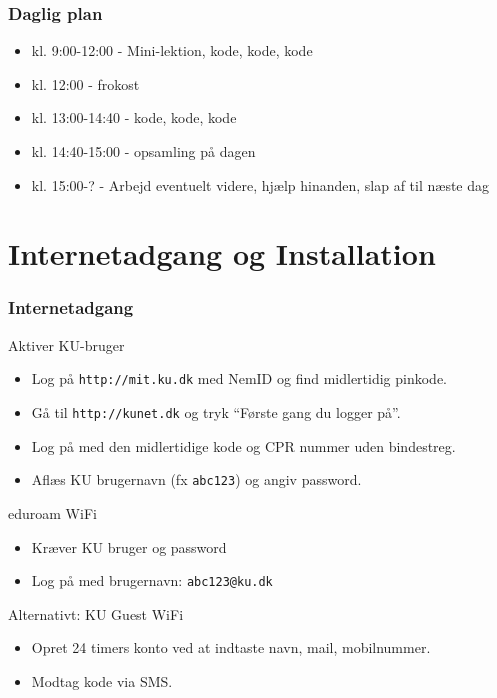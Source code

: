 \documentclass[10pt]{beamer}
\begin{document}


\begin{frame}
  \frametitle{Daglig plan}
  \begin{itemize}
  \item kl. 9:00-12:00 - Mini-lektion, kode, kode, kode
  \item kl. 12:00 - frokost
  \item kl. 13:00-14:40 - kode, kode, kode
  \item kl. 14:40-15:00 - opsamling på dagen
  \item kl. 15:00-? - Arbejd eventuelt videre, hjælp hinanden, slap af til næste dag
  \end{itemize}

\end{frame}


\section{Internetadgang og Installation}
\begin{frame}
  \frametitle{Internetadgang}

  Aktiver KU-bruger
  \begin{itemize}
  \item Log på \texttt{http://mit.ku.dk} med NemID og find midlertidig pinkode.
  \item Gå til \texttt{http://kunet.dk} og tryk ``Første gang du logger på''.
  \item Log på med den midlertidige kode og CPR nummer uden bindestreg.
  \item Aflæs KU brugernavn (fx \texttt{abc123}) og angiv password.
  \end{itemize}

  \vspace{5mm} 
  eduroam WiFi
  \begin{itemize}
  \item Kræver KU bruger og password
  \item Log på med brugernavn: \texttt{abc123@ku.dk}
  \end{itemize}

  \vspace{5mm} 
  Alternativt: KU Guest WiFi
  \begin{itemize}
  \item Opret 24 timers konto ved at indtaste navn, mail, mobilnummer. 
  \item Modtag kode via SMS.
  \end{itemize}
\end{frame}
\end{document}
